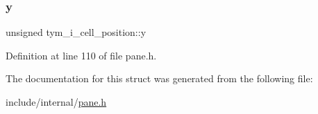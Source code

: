 \subsubsection{\texorpdfstring{y}{y}}
{\footnotesize\ttfamily unsigned tym\+\_\+i\+\_\+cell\+\_\+position\+::y}



Definition at line 110 of file pane.\+h.



The documentation for this struct was generated from the following file\+:\begin{DoxyCompactItemize}
\item 
include/internal/\hyperlink{pane_8h}{pane.\+h}\end{DoxyCompactItemize}
